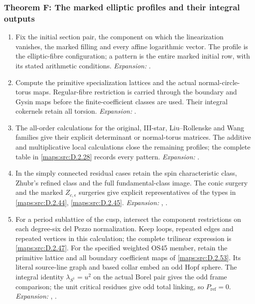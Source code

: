 \subsubsection*{Theorem F: The marked elliptic profiles and their integral outputs}
\begin{enumerate}[label=\arabic*.,leftmargin=*]
\item\hypertarget{step-III-F-1}{} Fix the initial section pair, the component on which the
linearization vanishes, the marked filling and every affine
logarithmic vector.  The profile is the elliptic-fibre configuration;
a pattern is the entire marked initial row, with its stated
arithmetic conditions.
\textit{Expansion:} .
\item\hypertarget{step-III-F-2}{} Compute the primitive specialization lattices and the actual
normal-circle-torus maps.  Regular-fibre restriction is carried
through the boundary and Gysin maps before the finite-coefficient
classes are used.  Their integral cokernels retain all torsion.
\textit{Expansion:} .
\item\hypertarget{step-III-F-3}{} The all-order calculations for the original, III-star,
Liu--Rollenske and Wang families give their explicit determinant
or normal-torus matrices.  The additive and multiplicative local
calculations close the remaining profiles; the complete table in
\cref{maps:src:D.2.28} records every pattern.
\textit{Expansion:} .
\item\hypertarget{step-III-F-4}{} In the simply connected residual cases retain the spin
characteristic class, Zhubr's refined class and the full
fundamental-class image.  The conic surgery and the marked
$Z_{c,\epsilon}$ surgeries give explicit representatives of the
types in \cref{maps:src:D.2.44}, \cref{maps:src:D.2.45}.
\textit{Expansion:} , .
\item\hypertarget{step-III-F-5}{} For a period sublattice of the cusp, intersect the component
restrictions on each degree-six del Pezzo normalization.  Keep
loops, repeated edges and repeated vertices in this calculation;
the complete trilinear expression is \cref{maps:src:D.2.47}.
For the specified weighted OS45 member, retain the primitive lattice
and all boundary coefficient maps of \cref{maps:src:D.2.53}.
Its literal source-line graph and based collar embed an odd Hopf
sphere. The integral identity $\lambda_{S^1}=u^2$ on the actual Borel
pair gives the odd frame comparison; the unit critical residues give
odd total linking, so $P_{\mathrm{ref}}=0$.
\textit{Expansion:} , .


\end{enumerate}
